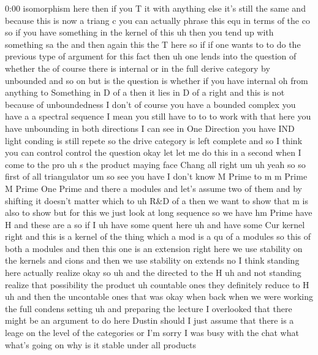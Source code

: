 \begin{unfinished}{0:00}
isomorphism  here  then  if  you  T  it  with
anything  else  it's  still  the  same  and
because  this  is  now  a  triang  c  you  can
actually  phrase  this  equ  in  terms  of  the
co  so  if  you  have  something  in  the
kernel  of  this  uh  then  you  tend  up  with
something  sa
the
and  then  again  this  the  T
here
so  if  if  one  wants  to  to  do  the  previous
type  of  argument  for  this  fact  then  uh
one  lends  into  the  question  of  whether
the  of  course  there  is  internal  or  in
the  full  derive  category  by  unbounded
and  so  on  but  is  the  question  is  whether
if  you  have  internal  oh  from  anything  to
Something  in  D  of  a  then  it  lies  in  D  of
a  right  and  this  is  not  because  of
unboundedness  I  don't  of  course  you  have
a  bounded  complex  you  have  a  a  spectral
sequence  I  mean  you  still  have  to  to  to
work  with  that  here  you  have  unbounding
in  both  directions  I  can  see  in  One
Direction  you  have
IND  light  conding  is  still  repete  so  the
drive  category  is  left  complete  and  so  I
think  you  can
control  control  the
question  okay  let  let  me  do  this  in  a
second  when  I  come  to  the
pro  uh  s  the
product
maying  face
Chang
all  right
um
uh  yeah  so  so  first  of  all  triangulator
um
so  see  you
have  I  don't  know  M  Prime  to  m  m
Prime  M  Prime  One
Prime  and  there  a
modules  and  let's  assume  two  of  them  and
by  shifting  it  doesn't  matter  which  to
uh  R\&D  of
a  then  we  want  to  show  that  m  is
also  to
show  but  for  this  we  just  look  at  long
sequence  so  we  have
hm  Prime  have
H
and  these  are
a  so  if  I  uh  have  some  quent  here
uh  and  have  some  Cur
kernel  right  and  this  is  a  kernel  of  the
thing  which  a  mod  is  a  qu  of  a  modules
so  this  of  both  a  modules  and  then  this
one  is  an  extension
right
here  we  use  stability  on  the  kernels  and
cions  and  then  we  use  stability  on
extends
no  I  think  standing  here  actually
realize  okay
so
uh
and  the  directed  to  the
H  uh  and  not  standing  realize  that
possibility  the  product  uh  countable
ones  they  definitely  reduce  to
H
uh  and  then  the  uncontable  ones  that  was
okay  when  back  when  we  were  working  the
full  condens  setting  uh  and  preparing
the  lecture  I  overlooked  that  there
might  be  an  argument  to  do  here
Dustin  should  I  just  assume  that  there
is  a  leage  on  the  level  of  the
categories  or  I'm  sorry  I  was  busy  with
the  chat  what  what's  going
on  why  is  it  stable  under  all  products

\end{unfinished}
